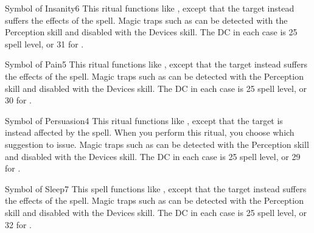\begin{spellsection}{Symbol of Insanity}{6}
\spellspecial This ritual functions like , except that the target instead suffers the effects of the  spell.
\spellnotes Magic traps such as  can be detected with the Perception skill and disabled with the Devices skill. The DC in each case is 25 \add spell level, or 31 for .
\end{spellsection}

\begin{spellsection}{Symbol of Pain}{5}
\spellspecial This ritual functions like , except that the target instead suffers the effects of the  spell.
\spellnotes Magic traps such as  can be detected with the Perception skill and disabled with the Devices skill. The DC in each case is 25 \add spell level, or 30 for .
\end{spellsection}

\begin{spellsection}{Symbol of Persuasion}{4}
\spellspecial This ritual functions like , except that the target is instead affected by the  spell. When you perform this ritual, you choose which suggestion to issue.
\spellnotes Magic traps such as  can be detected with the Perception skill and disabled with the Devices skill. The DC in each case is 25 \add spell level, or 29 for .
\end{spellsection}

\begin{spellsection}{Symbol of Sleep}{7}
\spelleffect This spell functions like , except that the target instead suffers the effects of the  spell.
\spellnotes Magic traps such as  can be detected with the Perception skill and disabled with the Devices skill. The DC in each case is 25 \add spell level, or 32 for .
\end{spellsection}

